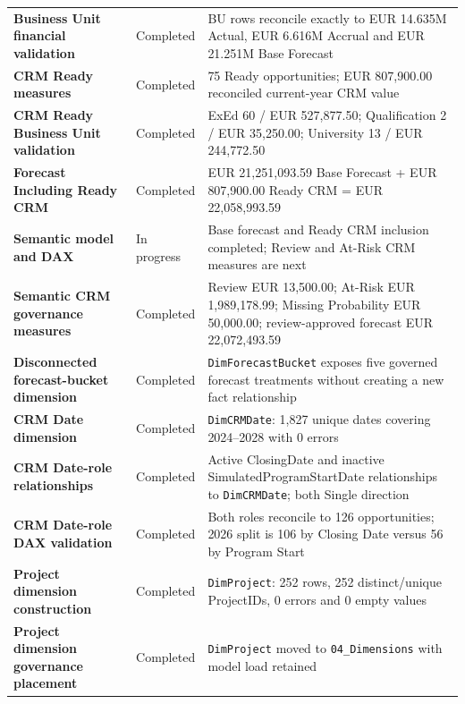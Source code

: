 \documentclass[11pt,a4paper]{article}
\begin{document}
\begin{tabularx}{\textwidth}{
    >{\bfseries}p{5.8cm}
    p{2.8cm}
    X
}
Business Unit financial validation
&
Completed
&
BU rows reconcile exactly to EUR 14.635M Actual, EUR 6.616M Accrual and EUR 21.251M Base Forecast
\\

CRM Ready measures
&
Completed
&
75 Ready opportunities; EUR 807,900.00 reconciled current-year CRM value
\\

CRM Ready Business Unit validation
&
Completed
&
ExEd 60 / EUR 527,877.50; Qualification 2 / EUR 35,250.00; University 13 / EUR 244,772.50
\\

Forecast Including Ready CRM
&
Completed
&
EUR 21,251,093.59 Base Forecast + EUR 807,900.00 Ready CRM = EUR 22,058,993.59
\\

Semantic model and DAX
&
In progress
&
Base forecast and Ready CRM inclusion completed; Review and At-Risk CRM measures are next
\\

Semantic CRM governance measures
&
Completed
&
Review EUR 13,500.00; At-Risk EUR 1,989,178.99; Missing Probability EUR 50,000.00;
review-approved forecast EUR 22,072,493.59
\\

Disconnected forecast-bucket dimension
&
Completed
&
\texttt{DimForecastBucket} exposes five governed forecast treatments without
creating a new fact relationship
\\

CRM Date dimension
&
Completed
&
\texttt{DimCRMDate}: 1,827 unique dates covering 2024--2028 with 0 errors
\\

CRM Date-role relationships
&
Completed
&
Active ClosingDate and inactive SimulatedProgramStartDate relationships to
\texttt{DimCRMDate}; both Single direction
\\

CRM Date-role DAX validation
&
Completed
&
Both roles reconcile to 126 opportunities; 2026 split is 106 by Closing Date
versus 56 by Program Start
\\

Project dimension construction
&
Completed
&
\texttt{DimProject}: 252 rows, 252 distinct/unique ProjectIDs, 0 errors and 0 empty values
\\

Project dimension governance placement
&
Completed
&
\texttt{DimProject} moved to \texttt{04\_Dimensions} with model load retained
\\


\end{tabularx}
\end{document}
